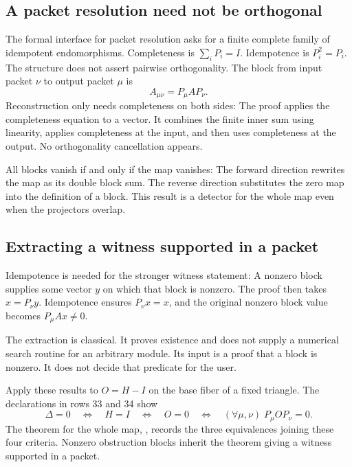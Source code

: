 \subsection{A packet resolution need not be orthogonal}
The formal interface for packet resolution asks for a finite complete family of idempotent endomorphisms.
Completeness is $\sum_iP_i=I$. Idempotence is $P_i^2=P_i$. The structure does not assert pairwise orthogonality. The block from input packet $\nu$ to output packet $\mu$ is
\[
 A_{\mu\nu}=P_\mu A P_\nu.
\]
Reconstruction only needs completeness on both sides:
The proof applies the completeness equation to a vector. It combines the finite inner sum using linearity, applies completeness at the input, and then uses completeness at the output. No orthogonality cancellation appears.

All blocks vanish if and only if the map vanishes:
The forward direction rewrites the map as its double block sum. The reverse direction substitutes the zero map into the definition of a block. This result is a detector for the whole map even when the projectors overlap.

\subsection{Extracting a witness supported in a packet}
Idempotence is needed for the stronger witness statement:
A nonzero block supplies some vector $y$ on which that block is nonzero. The proof then takes $x=P_\nu y$. Idempotence ensures $P_\nu x=x$, and the original nonzero block value becomes $P_\mu Ax\ne0$.

The extraction is classical. It proves existence and does not supply a numerical search routine for an arbitrary module. Its input is a proof that a block is nonzero. It does not decide that predicate for the user.

Apply these results to $O=H-I$ on the base fiber of a fixed triangle. The declarations in rows 33 and 34 show
\[
 \Delta=0\quad\Longleftrightarrow\quad H=I
 \quad\Longleftrightarrow\quad O=0
 \quad\Longleftrightarrow\quad
 (\forall\mu,\nu)\;P_\mu O P_\nu=0.
\]
The theorem for the whole map, , records the three equivalences joining these four criteria. Nonzero obstruction blocks inherit the theorem giving a witness supported in a packet.

